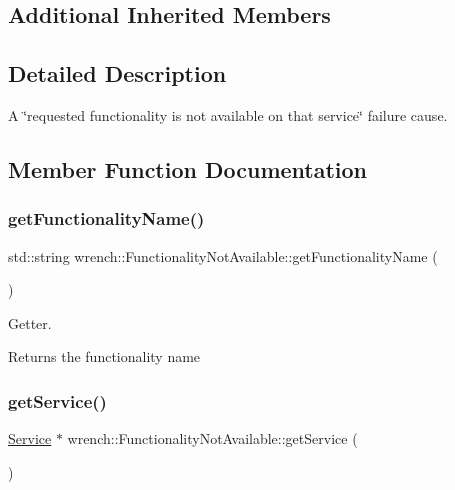\subsection*{Additional Inherited Members}


\subsection{Detailed Description}
A \char`\"{}requested functionality is not available on that service\char`\"{} failure cause. 

\subsection{Member Function Documentation}
\mbox{\label{classwrench_1_1_functionality_not_available_ab08a243a126daa6dfc538a7429f656b0}} 
\subsubsection{\texorpdfstring{get\+Functionality\+Name()}{getFunctionalityName()}}
{\footnotesize\ttfamily std\+::string wrench\+::\+Functionality\+Not\+Available\+::get\+Functionality\+Name (\begin{DoxyParamCaption}{ }\end{DoxyParamCaption})}



Getter. 

\begin{DoxyReturn}{Returns}
the functionality name 
\end{DoxyReturn}
\mbox{\label{classwrench_1_1_functionality_not_available_a0c29976839df8de89c833e135f754bbb}} 
\subsubsection{\texorpdfstring{get\+Service()}{getService()}}
{\footnotesize\ttfamily \hyperlink{classwrench_1_1_service}{Service} $\ast$ wrench\+::\+Functionality\+Not\+Available\+::get\+Service (\begin{DoxyParamCaption}{ }\end{DoxyParamCaption})}



